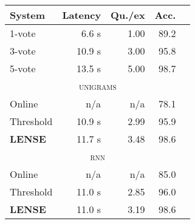 \begin{tabular}[b]{l  r  r  r  r}
    \textbf{System} & \textbf{Latency} & \textbf{Qu./ex} & \textbf{Acc.} \\ \hline
    1-vote & 6.6 s & 1.00 & 89.2 \\ %
    3-vote & 10.9 s & 3.00 & 95.8 \\ %
    5-vote & 13.5 s & 5.00 & 98.7 \\ %
    \multicolumn{5}{c}{\textsc{unigrams}} \\ \hline
    Online & n/a & n/a & 78.1 \\ %
    Threshold & 10.9 s & 2.99 & 95.9 \\ %
    \textbf{LENSE} & 11.7 s & 3.48 & 98.6 \\ %
    \multicolumn{5}{c}{\textsc{rnn}} \\ \hline
    Online & n/a & n/a & 85.0 \\ %
    Threshold & 11.0 s & 2.85 & 96.0 \\ %
    \textbf{LENSE} & 11.0 s & 3.19 & 98.6 \\%
\end{tabular}

